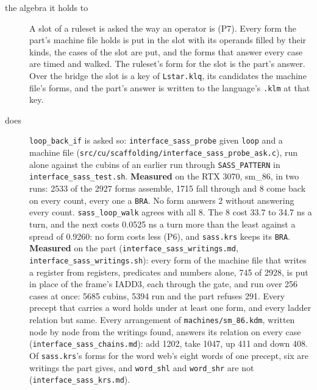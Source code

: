 \begin{description}
\item[{the algebra it holds to}] A slot of a ruleset is asked the way an operator is (P7). Every form the part's machine file holds is put in the slot with its operands filled by their kinds, the cases of the slot are put, and the forms that answer every case are timed and walked. The ruleset's form for the slot is the part's answer. Over the bridge the slot is a key of \texttt{Lstar.\allowbreak{}klq}, its candidates the machine file's forms, and the part's answer is written to the language's \texttt{.\allowbreak{}klm} at that key.
\item[{does}] \texttt{loop\_\allowbreak{}back\_\allowbreak{}if} is asked so: \texttt{interface\_\allowbreak{}sass\_\allowbreak{}probe} given \texttt{loop} and a machine file (\texttt{src/\allowbreak{}cu/\allowbreak{}scaffolding/\allowbreak{}interface\_\allowbreak{}sass\_\allowbreak{}probe\_\allowbreak{}ask.\allowbreak{}c}), run alone against the cubins of an earlier run through \texttt{SASS\_\allowbreak{}PATTERN} in \texttt{interface\_\allowbreak{}sass\_\allowbreak{}test.\allowbreak{}sh}. \textbf{Measured} on the RTX 3070, sm\_\allowbreak{}86, in two runs: 2533 of the 2927 forms assemble, 1715 fall through and 8 come back on every count, every one a \texttt{BRA}. No form answers 2 without answering every count. \texttt{sass\_\allowbreak{}loop\_\allowbreak{}walk} agrees with all 8. The 8 cost 33.7 to 34.7 ns a turn, and the next costs 0.0525 ns a turn more than the least against a spread of 0.9260: no form costs less (P6), and \texttt{sass.\allowbreak{}krs} keeps its \texttt{BRA}. \textbf{Measured} on the part (\texttt{interface\_\allowbreak{}sass\_\allowbreak{}writings.\allowbreak{}md}, \texttt{interface\_\allowbreak{}sass\_\allowbreak{}writings.\allowbreak{}sh}): every form of the machine file that writes a register from registers, predicates and numbers alone, 745 of 2928, is put in place of the frame's IADD3, each through the gate, and run over 256 cases at once: 5685 cubins, 5394 run and the part refuses 291. Every precept that carries a word holds under at least one form, and every ladder relation but same. Every arrangement of \texttt{machines/\allowbreak{}sm\_\allowbreak{}86.\allowbreak{}kdm}, written node by node from the writings found, answers its relation on every case (\texttt{interface\_\allowbreak{}sass\_\allowbreak{}chains.\allowbreak{}md}): add 1202, take 1047, up 411 and down 408. Of \texttt{sass.\allowbreak{}krs}'s forms for the word web's eight words of one precept, six are writings the part gives, and \texttt{word\_\allowbreak{}shl} and \texttt{word\_\allowbreak{}shr} are not (\texttt{interface\_\allowbreak{}sass\_\allowbreak{}krs.\allowbreak{}md}).

\end{description}
